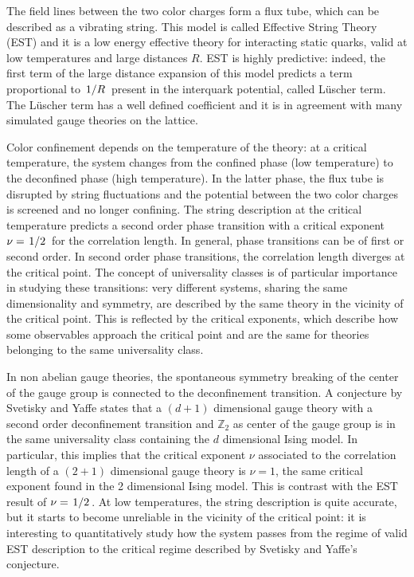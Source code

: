 \documentclass[reqno,11pt]{article}
\numberwithin{equation}{section}
\begin{document}
The field lines between the two color charges form a flux tube, which can be described as a vibrating string. This model
is called Effective String Theory (EST) and it is a low energy effective theory for interacting static quarks, valid at
low temperatures and large distances $R$. EST is highly predictive: indeed, the first term of the large distance expansion
of this model predicts a term proportional to $\flatfrac{1}{R}$ present in the interquark potential, called L{\"u}scher term.
The L{\"u}scher term has a well defined coefficient and it is in agreement with many simulated gauge theories on the lattice.

Color confinement depends on the temperature of the theory: at a critical temperature, the system changes from the
confined phase (low temperature) to the deconfined phase (high temperature). In the latter phase, the flux tube is disrupted
by string fluctuations and the potential between the two color charges is screened and no longer confining. The string 
description at the critical temperature predicts a second order phase transition with a critical exponent 
$\nu = \flatfrac{1}{2}$ for the correlation length. In general, phase transitions can be of first or second order. In second
order phase transitions, the correlation length diverges at the critical point. The concept of universality classes is
of particular importance in studying these transitions: very different systems, sharing the same dimensionality and
symmetry, are described by the same theory in the vicinity of the critical point. This is reflected by the critical exponents,
which describe how some observables approach the critical point and are the same for theories belonging 
to the same universality class.

In non abelian gauge theories, the spontaneous symmetry breaking of the center of the gauge group is connected
to the deconfinement transition. A conjecture by Svetisky and Yaffe states that a $(d+1)$ dimensional gauge theory with a
second order deconfinement transition and $\mathbb{Z}_2$ as center of the gauge group is in the same universality class
containing the $d$ dimensional Ising model. In particular, this implies that the critical exponent $\nu$ associated to the
correlation length of a $(2+1)$ dimensional gauge theory is $\nu = 1$, the same critical exponent found in the 2 dimensional
Ising model. This is contrast with the EST result of $\nu = \flatfrac{1}{2}$. At low temperatures, the string description
is quite accurate, but it starts to become unreliable in the vicinity of the critical point: it is interesting to 
quantitatively study how the system passes from the regime of valid EST description to the critical regime described by
Svetisky and Yaffe's conjecture.
\end{document}
